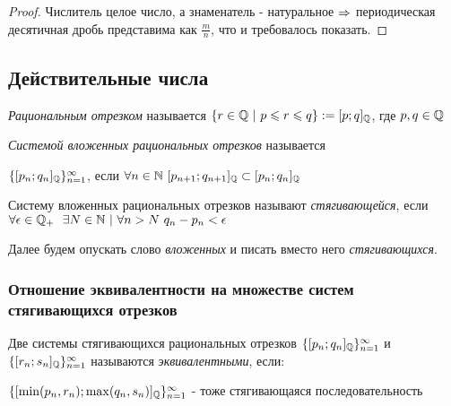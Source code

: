 \begin{proof}
    Числитель целое число, а знаменатель - натуральное $\Rightarrow$ периодическая десятичная дробь представима как $\frac{m}{n}$, что и требовалось показать.
\end{proof}

\subsection{Действительные числа}



\begin{definition}
    \textit{Рациональным отрезком} называется $\{r \in \mathbb{Q}\ |\ p \leqslant r \leqslant q\} := [p; q]_{\mathbb{Q}}$, где $p, q \in \mathbb{Q}$
\end{definition}

\begin{definition}
    \textit{Системой вложенных рациональных отрезков} называется 
    
    $\{[p_n;q_n]_{\mathbb{Q}}\}_{n = 1}^\infty$, если $\forall n \in \mathbb{N}\ [p_{n + 1}; q_{n + 1}]_{\mathbb{Q}} \subset [p_n; q_n]_{\mathbb{Q}}$
\end{definition}

\begin{definition}
    Систему вложенных рациональных отрезков называют \textit{стягивающейся}, если $\forall \epsilon \in \mathbb{Q}_+\ \ \exists N \in \mathbb{N}\ |\ \forall n > N\ q_n - p_n < \epsilon$
    
    Далее будем опускать слово \textit{вложенных} и писать вместо него \textit{стягивающихся}.
\end{definition}

\subsubsection*{Отношение эквивалентности на множестве систем стягивающихся отрезков}

\begin{definition}
    Две системы стягивающихся рациональных отрезков $\{[p_n; q_n]_{\mathbb{Q}}\}_{n = 1}^\infty$ и $\{[r_n; s_n]_{\mathbb{Q}}\}_{n = 1}^\infty$ называются \textit{эквивалентными}, если:
    
    $\{[\min(p_n, r_n); \max(q_n, s_n)]_{\mathbb{Q}}\}_{n = 1}^\infty$ - тоже стягивающаяся последовательность
\end{definition}

